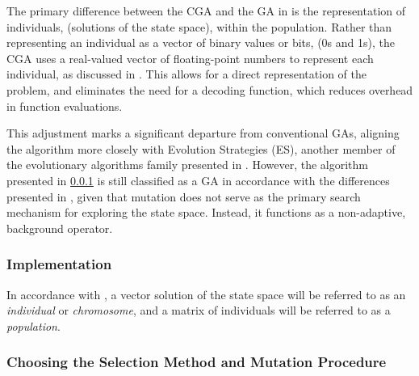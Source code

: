 \documentclass[10pt]{article}
\begin{document}
\begin{multicols}{2}
The primary difference between the CGA and the GA in \cite{parks2023geneticalgorithms} is the representation of individuals, (solutions of the state space), within the population. Rather than representing an individual as a vector of binary values or bits, (0s and 1s), the CGA uses a real-valued vector of floating-point numbers to represent each individual, as discussed in \cite{PGA}. This allows for a direct representation of the problem, and eliminates the need for a decoding function, which reduces overhead in function evaluations.

This adjustment marks a significant departure from conventional GAs, aligning the algorithm more closely with Evolution Strategies (ES), another member of the evolutionary algorithms family presented in \cite{salimans2017evolution}. However, the algorithm presented in \ref{sec:CGA_implementation} is still classified as a GA in accordance with the differences presented in \cite{10.1007/BFb0029787}, given that mutation does not serve as the primary search mechanism for exploring the state space. Instead, it functions as a non-adaptive, background operator.

\subsubsection{Implementation}
\label{sec:CGA_implementation}

In accordance with \cite{parks2023geneticalgorithms}, a vector solution of the state space will be referred to as an \textit{individual} or \textit{chromosome}, and a matrix of individuals will be referred to as a \textit{population}. 

\end{multicols}

\subsubsection{Choosing the Selection Method and Mutation Procedure}
\end{document}
